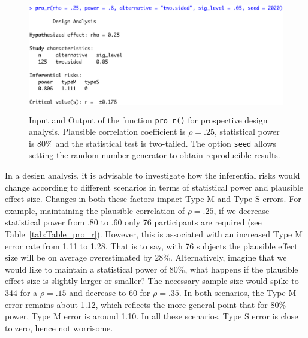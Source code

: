 \documentclass{article}\usepackage[]{graphicx}\usepackage[]{color}
\begin{document}
\begin{figure}[!h]
\centering
  \includegraphics[height=5cm]{screens/pro}
\caption{Input and Output of the function \texttt{pro\_r()} for prospective design analysis. Plausible correlation coefficient is $\rho = .25$, statistical power is 80\% and the statistical test is two-tailed. The option \texttt{seed} allows setting the random number generator to obtain reproducible results.}\label{fig:pro_r}
\end{figure}

In a design analysis, it is advisable to investigate how the inferential risks would change according to different scenarios in terms of statistical power and plausible effect size. Changes in both these factors impact Type M and Type S errors. For example, maintaining the plausible correlation of $\rho = .25$, if we decrease statistical power from .80 to .60 only 76 participants are required (see Table~\ref{tab:Table_pro_r}). However, this is associated with an increased Type M error rate from 1.11 to 1.28. That is to say, with 76 subjects the plausible effect size will be on average overestimated by 28\%. Alternatively, imagine that we would like to maintain a statistical power of 80\%, what happens if the plausible effect size is slightly larger or smaller? The necessary sample size would spike to 344 for a $\rho=.15$  and decrease to 60 for $\rho=.35$. In both scenarios, the Type M error remains about 1.12, which reflects the more general point that for 80\% power, Type M error is around 1.10. In all these scenarios, Type S error is close to zero, hence not worrisome.
\end{document}
